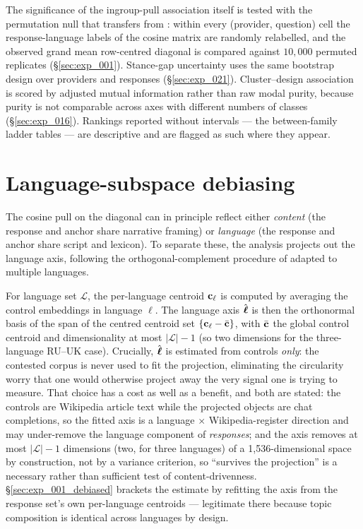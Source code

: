 The significance of the ingroup-pull association itself is tested
with the permutation null that transfers from
\citet{caliskan2017semantics}: within every (provider, question)
cell the response-language labels of the cosine matrix are randomly
relabelled, and the observed grand mean row-centred diagonal is
compared against $10{,}000$ permuted replicates
(\S\ref{sec:exp_001}). Stance-gap uncertainty uses the same
bootstrap design over providers and responses
(\S\ref{sec:exp_021}). Cluster--design association is scored by
adjusted mutual information rather than raw modal purity, because
purity is not comparable across axes with different numbers of
classes (\S\ref{sec:exp_016}). Rankings reported without intervals
--- the between-family ladder tables --- are descriptive and are
flagged as such where they appear.

\section{Language-subspace debiasing}\label{sec:debiasing}

The cosine pull on the diagonal can in principle reflect either
\emph{content} (the response and anchor share narrative framing) or
\emph{language} (the response and anchor share script and lexicon).
To separate these, the analysis projects out the language axis,
following the orthogonal-complement procedure of
\citet{bolukbasi2016man} adapted to multiple languages.

For language set \(\mathcal{L}\), the per-language centroid
\(\mathbf{c}_\ell\) is computed by averaging the control embeddings
in language \(\ell\). The language axis $\hat{\boldsymbol{\ell}}$ is then the
orthonormal basis of the span of the centred centroid set
\(\{\mathbf{c}_\ell - \bar{\mathbf{c}}\}\), with $\bar{\mathbf{c}}$ the
global control centroid and dimensionality at most
\(|\mathcal{L}| - 1\) (so two dimensions for the three-language
RU--UK case). Crucially, $\hat{\boldsymbol{\ell}}$ is estimated from controls
\emph{only}: the contested corpus is never used to fit the
projection, eliminating the circularity worry that one would
otherwise project away the very signal one is trying to measure.
That choice has a cost as well as a benefit, and both are stated:
the controls are Wikipedia article text while the projected objects
are chat completions, so the fitted axis is a language
$\times$ Wikipedia-register direction and may under-remove the
language component of \emph{responses}; and the axis removes at
most $|\mathcal{L}| - 1$ dimensions (two, for three languages) of a
1{,}536-dimensional space by construction, not by a variance
criterion, so ``survives the projection'' is a necessary rather
than sufficient test of content-drivenness. \S\ref{sec:exp_001_debiased}
brackets the estimate by refitting the axis from the response set's
own per-language centroids --- legitimate there because topic
composition is identical across languages by design.

